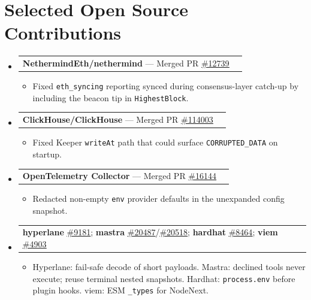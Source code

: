 \documentclass[letterpaper,11pt]{article}
\makeatletter
\newcommand{\resumeItem}[1]{
  \item\small{
    {#1 \vspace{-5pt}}
  }
}
\newcommand{\resumeProjectHeading}[2]{
  \item
    \begin{tabular*}{0.97\textwidth}{l@{\extracolsep{\fill}}r}
      \small#1 & #2 \\
    \end{tabular*}\vspace{-9pt}
}
\newcommand{\resumeSubHeadingListStart}{\begin{itemize}[leftmargin=0.15in, label={}]}
\newcommand{\resumeSubHeadingListEnd}{\end{itemize}}
\newcommand{\resumeItemListStart}{\begin{itemize}}
\newcommand{\resumeItemListEnd}{\end{itemize}\vspace{-10pt}}
\makeatother
\begin{document}
\section{Selected Open Source Contributions}
  \resumeSubHeadingListStart
    \resumeProjectHeading
      {\textbf{NethermindEth/nethermind} --- Merged PR \href{https://github.com/NethermindEth/nethermind/pull/12739}{\underline{\#12739}}}{}
      \resumeItemListStart
        \resumeItem{Fixed \texttt{eth\_syncing} reporting synced during consensus-layer catch-up by including the beacon tip in \texttt{HighestBlock}.}
      \resumeItemListEnd
    \resumeProjectHeading
      {\textbf{ClickHouse/ClickHouse} --- Merged PR \href{https://github.com/ClickHouse/ClickHouse/pull/114003}{\underline{\#114003}}}{}
      \resumeItemListStart
        \resumeItem{Fixed Keeper \texttt{writeAt} path that could surface \texttt{CORRUPTED\_DATA} on startup.}
      \resumeItemListEnd
    \resumeProjectHeading
      {\textbf{OpenTelemetry Collector} --- Merged PR \href{https://github.com/open-telemetry/opentelemetry-collector/pull/16144}{\underline{\#16144}}}{}
      \resumeItemListStart
        \resumeItem{Redacted non-empty \texttt{env} provider defaults in the unexpanded config snapshot.}
      \resumeItemListEnd
    \resumeProjectHeading
      {\textbf{hyperlane} \href{https://github.com/hyperlane-xyz/hyperlane-monorepo/pull/9181}{\underline{\#9181}}; \textbf{mastra} \href{https://github.com/mastra-ai/mastra/pull/20487}{\underline{\#20487}}/\href{https://github.com/mastra-ai/mastra/pull/20518}{\underline{\#20518}}; \textbf{hardhat} \href{https://github.com/NomicFoundation/hardhat/pull/8464}{\underline{\#8464}}; \textbf{viem} \href{https://github.com/wevm/viem/pull/4903}{\underline{\#4903}}}{}
      \resumeItemListStart
        \resumeItem{Hyperlane: fail-safe decode of short payloads. Mastra: declined tools never execute; reuse terminal nested snapshots. Hardhat: \texttt{process.env} before plugin hooks. viem: ESM \texttt{\_types} for NodeNext.}
      \resumeItemListEnd
  \resumeSubHeadingListEnd
\end{document}
